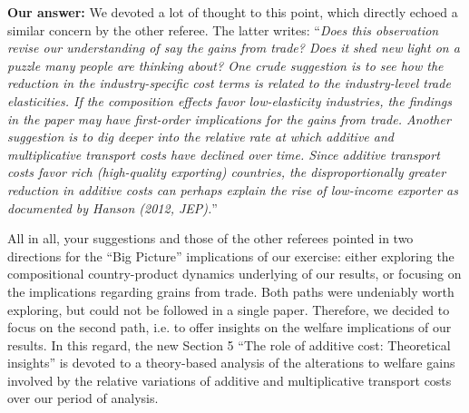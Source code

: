 \documentclass[a4paper,11pt]{article}
\begin{document}
\textbf{Our answer:} We devoted a lot of thought to this point, which directly echoed a similar concern by the other referee. The latter writes: ``\emph{Does this observation revise our understanding of say the gains from trade? Does it shed new light on a puzzle many people are thinking about?
One crude suggestion is to see how the reduction in the industry-specific cost terms is related to the industry-level trade elasticities. If the composition effects favor low-elasticity industries, the findings in the paper may have first-order implications for the gains from trade. Another suggestion is to dig deeper into the relative rate at which additive and multiplicative transport costs have declined over time. Since additive transport costs favor rich (high-quality exporting) countries, the disproportionally greater reduction in additive costs can perhaps explain the rise of low-income exporter as documented by Hanson (2012, JEP).}''

All in all, your suggestions and those of the other referees pointed in two directions for the ``Big Picture'' implications of our exercise: either exploring the compositional country-product dynamics underlying of our results, or focusing on the implications regarding grains from trade. Both paths were undeniably worth exploring, but could not be followed in a single paper. Therefore, we decided to focus on the second path, i.e. to  offer insights on the welfare implications of our results. In this regard, the new Section 5 ``The role of additive cost: Theoretical insights'' is devoted to a theory-based analysis of the alterations to welfare gains involved by the relative variations of additive and multiplicative transport costs over our period of analysis.
\end{document}
